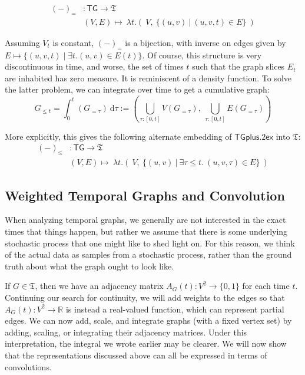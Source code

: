 \documentclass{article}
\theoremstyle{definition}
\begin{document}
	\begin{align*}
		(-)_{=}&: \mathsf{TG} \to \mathfrak T \\
		&(V, E) \mapsto ~\lambda t.\left( ~V,~\Big\{ (u,v)~\Big|~(u,v,t)\in E \Big\}~\right)
	\end{align*}
	
	Assuming $V_t$ is constant, $(-)_=$ is a bijection, with inverse on edges given by $E \mapsto \{ (u,v,t) \mid \exists t. (u,v) \in E(t) \}$. Of course, this structure is very discontinuous in time, and worse, the set of times $t$ such that the graph slices $E_t$ are inhabited has zero measure. It is reminiscent of a density function. To solve the latter problem, we can integrate over time to get a cumulative graph:
	\[ G_{\leq t} =  \int_0^t (G_{=\tau} )~\mathrm d \tau :=
		 \left( \bigcup_{\tau : [0,t]} V(G_{=\tau}), ~\bigcup_{\tau : [0,t]} E(G_{=\tau}) \right)\]
	
	More explicitly, this gives the following alternate embedding of $\mathsf{TG plus .2ex}$ into $\mathfrak T$:
	\begin{align*}
	(-)_{\leq}&: \mathsf{TG} \to \mathfrak T \\
	&(V, E) \mapsto ~\lambda t.\left( ~V,~\Big\{ (u,v)~\Big|~\exists \tau \leq t.~(u,v,\tau)\in E \Big\}~\right)
	\end{align*}
	
	
	
	\subsection{Weighted Temporal Graphs and Convolution}
	When analyzing temporal graphs, we generally are not interested in the exact times that things happen, but rather we assume that there is some underlying stochastic process that one might like to shed light on. For this reason, we think of the actual data as samples from a stochastic process, rather than the ground truth about what the graph ought to look like.
	
	
	If $G \in \mathfrak T$, then we have an adjacency matrix $A_G(t) : V^2 \to \{0,1\}$ for each time $t$. Continuing our search for continuity, we will add weights to the edges so that $A_G(t) : V^2 \to \mathbb R$ is instead a real-valued function, which can represent partial edges. We can now add, scale, and integrate graphs (with a fixed vertex set) by adding, scaling, or integrating their adjacency matrices.
	Under this interpretation, the integral we wrote earlier may be clearer. We will now show that the representations discussed above can all be expressed in terms of convolutions.
	
\end{document}
